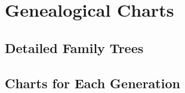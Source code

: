 \chapter{Genealogical Charts}

\section{Detailed Family Trees}

\section{Charts for Each Generation}